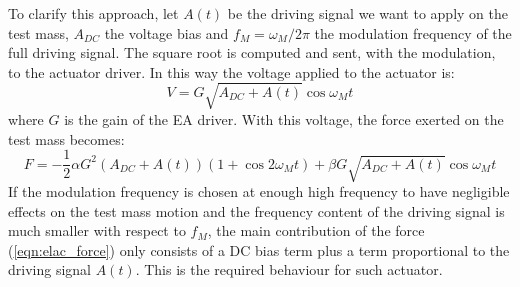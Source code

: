 To clarify this approach, let $A(t)$ be the driving signal we want to apply on the test mass, $A_{DC}$ the voltage bias and $f_M=\omega_M/2\pi$ the modulation frequency of the full driving signal. The square root is computed and sent, with the modulation, to the actuator driver. In this way the voltage applied to the actuator is:
\begin{equation}
\label{eqn:voltage}
V=G\sqrt{A_{DC}+A(t)}\cos{\omega_M t}
\end{equation}
where $G$ is the gain of the EA driver. With this voltage, the force exerted on the test mass becomes:
\begin{equation}
\label{eqn:elac_force}
F=-\frac{1}{2}\alpha G^2\left( A_{DC}+A(t)\right)\left(1+\cos{2\omega_M t}\right)+\beta G \sqrt{A_{DC}+A(t)}\cos{\omega_M t}
\end{equation}
If the modulation frequency is chosen at enough high frequency to have negligible effects on the test mass motion and the frequency content of the driving signal is much smaller with respect to $f_M$, the main contribution of the force (\ref{eqn:elac_force}) only consists of a DC bias term plus a term proportional to the driving signal $A(t)$. This is the required behaviour for such actuator.

